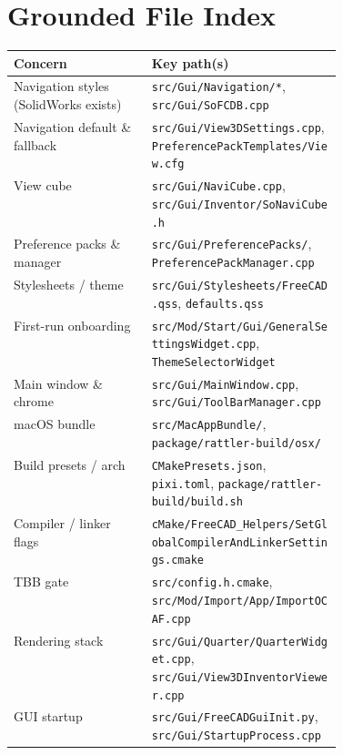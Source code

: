 \documentclass[11pt]{article}
\newcommand{\hairrule}{\vspace{2pt}{\color{hairline}\hrule height 0.6pt}\vspace{2pt}}
\begin{document}
\section{Grounded File Index}
\noindent\begin{tabularx}{\linewidth}{@{}p{0.42\linewidth}L@{}}
\toprule
\textbf{Concern} & \textbf{Key path(s)} \\
\midrule
Navigation styles (SolidWorks exists) & \texttt{src/Gui/Navigation/*}, \texttt{src/Gui/SoFCDB.cpp} \\
Navigation default \& fallback & \texttt{src/Gui/View3DSettings.cpp}, \texttt{PreferencePackTemplates/View.cfg} \\
View cube & \texttt{src/Gui/NaviCube.cpp}, \texttt{src/Gui/Inventor/SoNaviCube.h} \\
Preference packs \& manager & \texttt{src/Gui/PreferencePacks/}, \texttt{PreferencePackManager.cpp} \\
Stylesheets / theme & \texttt{src/Gui/Stylesheets/FreeCAD.qss}, \texttt{defaults.qss} \\
First-run onboarding & \texttt{src/Mod/Start/Gui/GeneralSettingsWidget.cpp}, \texttt{ThemeSelectorWidget} \\
Main window \& chrome & \texttt{src/Gui/MainWindow.cpp}, \texttt{src/Gui/ToolBarManager.cpp} \\
macOS bundle & \texttt{src/MacAppBundle/}, \texttt{package/rattler-build/osx/} \\
Build presets / arch & \texttt{CMakePresets.json}, \texttt{pixi.toml}, \texttt{package/rattler-build/build.sh} \\
Compiler / linker flags & \texttt{cMake/FreeCAD\_Helpers/SetGlobalCompilerAndLinkerSettings.cmake} \\
TBB gate & \texttt{src/config.h.cmake}, \texttt{src/Mod/Import/App/ImportOCAF.cpp} \\
Rendering stack & \texttt{src/Gui/Quarter/QuarterWidget.cpp}, \texttt{src/Gui/View3DInventorViewer.cpp} \\
GUI startup & \texttt{src/Gui/FreeCADGuiInit.py}, \texttt{src/Gui/StartupProcess.cpp} \\
\bottomrule
\end{tabularx}

\vspace{1.2em}
\hairrule
\vspace{0.6em}
\end{document}
